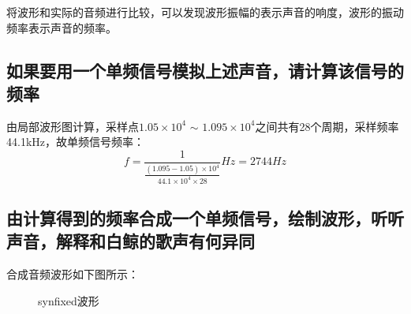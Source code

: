 \documentclass{article}
\begin{document}
            将波形和实际的音频进行比较，可以发现波形振幅的表示声音的响度，波形的振动频率表示声音的频率。

        \subsection{如果要用一个单频信号模拟上述声音，请计算该信号的频率}
            由局部波形图计算，采样点$1.05\times10^4$ $\sim$ $1.095\times10^4$之间共有28个周期，采样频率44.1kHz，故单频信号频率：
            $$f=\frac{1}{\frac{(1.095-1.05)\times10^4}{44.1\times10^4\times28}}Hz=2744Hz$$

        \subsection{由计算得到的频率合成一个单频信号，绘制波形，听听声音，解释和白鲸的歌声有何异同}
            合成音频波形如下图所示：
            \begin{figure}[htb]
                \centering
                \hspace{10pt}
                \caption{synfixed波形}
                \label{fig:synfixed}
            \end{figure}
\end{document}
